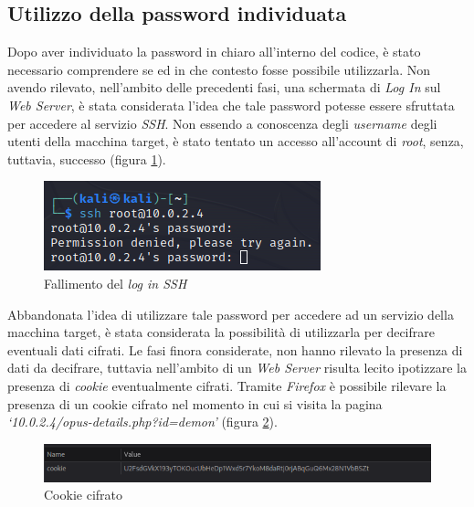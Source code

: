 \subsection{Utilizzo della password individuata}
Dopo aver individuato la password in chiaro all'interno del codice, è stato necessario comprendere se ed in che contesto fosse possibile utilizzarla. Non avendo rilevato, nell'ambito delle precedenti fasi, una schermata di \emph{Log In} sul \emph{Web Server}, è stata considerata l'idea che tale password potesse essere sfruttata per accedere al servizio \emph{SSH}. Non essendo a conoscenza degli \emph{username} degli utenti della macchina target, è stato tentato un accesso all'account di \emph{root}, senza, tuttavia, successo (figura \ref{fig:ssh_fail}). 
\begin{figure}[h]
    \centering
    \includegraphics[scale=1]{capitoli/images/ssh_fail.png}
    \caption{Fallimento del \emph{log in SSH}}
    \label{fig:ssh_fail}
\end{figure}
Abbandonata l'idea di utilizzare tale password per accedere ad un servizio della macchina target, è stata considerata la possibilità di utilizzarla per decifrare eventuali dati cifrati. Le fasi finora considerate, non hanno rilevato la presenza di dati da decifrare, tuttavia nell'ambito di un \emph{Web Server} risulta lecito ipotizzare la presenza di \emph{cookie} eventualmente cifrati. Tramite \emph{Firefox} è possibile rilevare la presenza di un cookie cifrato nel momento in cui si visita la pagina \emph{`10.0.2.4/opus-details.php?id=demon'} (figura \ref{fig:cookie}).
\begin{figure}[h]
    \centering
    \includegraphics[scale=1]{capitoli/images/cookie.png}
    \caption{Cookie cifrato}
    \label{fig:cookie}
\end{figure}

